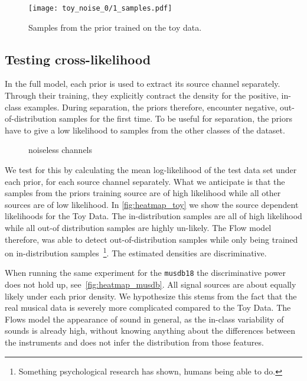 \begin{figure}
    \texttt{[image: toy\_noise\_0/1\_samples.pdf]}%
    \label{fig:toy_time_sample}%
    \caption{Samples from the prior trained on the toy data.}
\end{figure}

\subsection{Testing cross-likelihood}
In the full model, each prior is used to extract its source channel separately. Through their training, they explicitly contract the density for the positive, in-class examples. During separation, the priors therefore, encounter negative, out-of-distribution samples for the first time. To be useful for separation, the priors have to give a low likelihood to samples from the other classes of the dataset.

\begin{figure}
    \centering
    \caption{noiseless channels}%
    \label{fig:noiseless_channels}%
\end{figure}

We test for this by calculating the mean log-likelihood of the test data set under each prior, for each source channel separately. What we anticipate is that the samples from the priors training source are of high likelihood while all other sources are of low likelihood. In \cref{fig:heatmap_toy} we show the source dependent likelihoods for the Toy Data. The in-distribution samples are all of high likelihood while all out-of distribution samples are highly un-likely. The Flow model therefore, was able to detect out-of-distribution samples while only being trained on in-distribution samples~\footnote{Something psychological research has shown, humans being able to do.}. The estimated densities are discriminative.

When running the same experiment for the \texttt{musdb18} the discriminative power does not hold up, see~\cref{fig:heatmap_musdb}. All signal sources are about equally likely under each prior density. We hypothesize this stems from the fact that the real musical data is severely more complicated compared to the Toy Data. The Flows model the appearance of sound in general, as the in-class variability of sounds is already high, without knowing anything about the  differences between the instruments and does not infer the distribution from those features.

